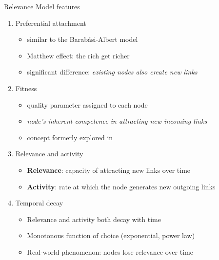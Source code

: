 \begin{frame}{Relevance Model features}
    \begin{enumerate}
        \item \alert{Preferential attachment}
        \begin{itemize}
            \item similar to the Barabási-Albert model
            \item Matthew effect: the rich get richer
            \item significant difference: \emph{existing nodes also create new links}
        \end{itemize}

        \item \alert{Fitness}
        \begin{itemize}
            \item quality parameter assigned to each node
            \item \emph{node’s inherent competence in attracting new incoming links}
            \item concept formerly explored in~\cite{Bianconi2001}
        \end{itemize}

        \item \alert{Relevance and activity}
        \begin{itemize}
            \item \textbf{Relevance}: capacity of attracting new links over time
            \item \textbf{Activity}: rate at which the node generates new outgoing links
        \end{itemize}

        \item \alert{Temporal decay}
        \begin{itemize}
            \item Relevance and activity both decay with time
            \item Monotonous function of choice (exponential, power law)
            \item Real-world phenomenon: nodes lose relevance over time
        \end{itemize}
    \end{enumerate}
\end{frame}

